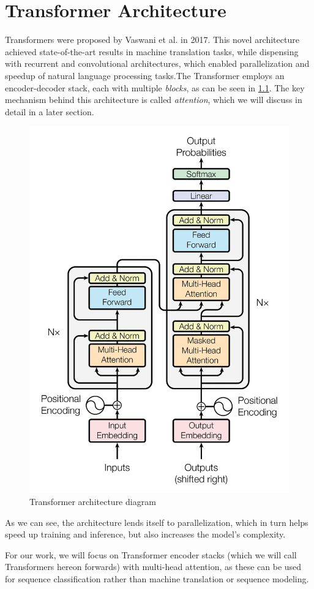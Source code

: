 \chapter{Transformer Architecture}

Transformers \cite{attention_is_all_you_need} were proposed by Vaswani et al. in 2017. This novel architecture achieved state-of-the-art results in machine translation tasks, while dispensing with recurrent and convolutional architectures, which enabled parallelization and speedup of natural language processing tasks.The Transformer employs an encoder-decoder stack, each with multiple \emph{blocks}, as can be seen in \ref{fig:transformer}. The key mechanism behind this architecture is called \emph{attention}, which we will discuss in detail in a later section.

\begin{figure}[h]
    \centering
    \includegraphics[width=0.6\linewidth]{docs/figs/transformer.png}
    \caption{Transformer architecture diagram \cite{attention_is_all_you_need}}
    \label{fig:transformer}
\end{figure}

As we can see, the architecture lends itself to parallelization, which in turn helps speed up training and inference, but also increases the model's complexity.

For our work, we will focus on Transformer encoder stacks (which we will call Transformers hereon forwards) with multi-head attention, as these can be used for sequence classification rather than machine translation or sequence modeling.

